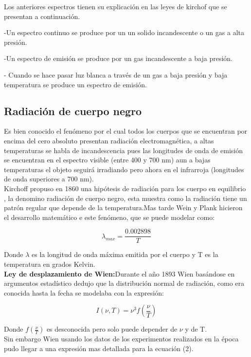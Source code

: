 
Los anteriores espectros tienen su explicación en las leyes de kirchof  que se presentan a continuación.

-Un espectro continuo se produce por un un solido incandescente o un gas a alta presión.

-Un espectro de emisión se produce por un gas incandescente a baja presión.

- Cuando se hace pasar luz blanca a través de un gas a baja presión y baja temperatura se produce un espectro de emisión.

\subsection {Radiación de cuerpo negro}
Es bien conocido el fenómeno por el cual todos los cuerpos que se encuentran por encima del cero absoluto presentan radiación electromagnética, a altas temperaturas se habla de incandescencia pues las longitudes de onda de emisión se encuentran en el espectro visible (entre 400 y 700 nm) aun a bajas temperaturas  el objeto seguirá irradiando pero ahora en el infrarroja (longitudes de onda superiores a 700 nm).\cite{libro2} \\
Kirchoff propuso en 1860   una hipótesis  de radiación para los cuerpo en equilibrio , la denomino radiación de cuerpo negro, esta muestra como la radiación tiene un patrón regular que depende de la temperatura.Mas tarde  Wein y Plank  hicieron el desarrollo matemático e este fenómeno, que se puede modelar como:


\begin{equation}
    \lambda_{max}=\frac{0.002898}{T}
\end{equation}


Donde $ \lambda$ es la longitud de onda máxima emitida por el cuerpo y T es la temperatura en grados Kelvin.\\

\noindent \textbf{Ley de desplazamiento de Wien:}Durante el año 1893 Wien basándose en argumentos estadístico dedujo que la distribución normal de radiación, como era conocida hasta la fecha se modelaba  con la expresión:  


\begin{equation}
    I(\nu,T)=\nu^3 f \left(\frac{\nu}{T}\right)
\end{equation}


\noindent Donde $f\left(\frac{\nu}{T}\right)$ es desconocida pero solo puede depender de $\nu$ y de T.\\
Sin embargo Wien usando los datos de los experimentos realizados en la época pudo llegar a una expresión mas detallada para la ecuación  (2).  



